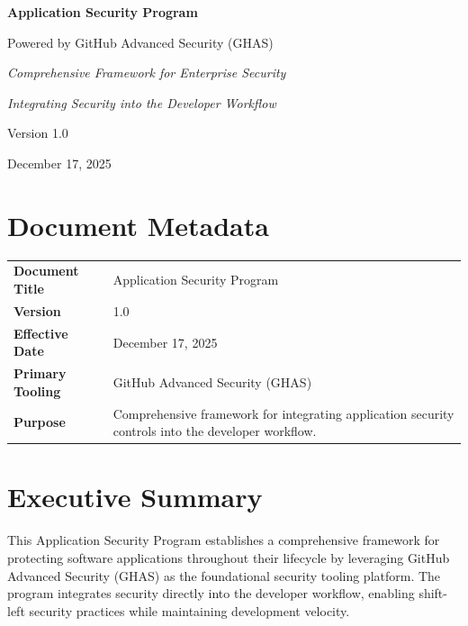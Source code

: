 \documentclass[11pt]{article}
\begin{document}
\begin{titlepage}
\centering
\vspace*{1.5cm}
{\LARGE\bfseries Application Security Program\par}
\vspace{0.4cm}
{\Large Powered by GitHub Advanced Security (GHAS)\par}
\vspace{0.9cm}
{\large\itshape Comprehensive Framework for Enterprise Security\par}
\vspace{0.25em}
{\large\itshape Integrating Security into the Developer Workflow\par}
\vspace{0.25em}
\vfill
{\large Version 1.0\par}
{\large December 17, 2025\par}
\end{titlepage}

\tableofcontents
\clearpage

\section*{Document Metadata}

\begin{tabular}{@{}p{}p{}@{}}
\toprule
\textbf{Document Title} & Application Security Program \\
\textbf{Version} & 1.0 \\
\textbf{Effective Date} & December 17, 2025 \\
\textbf{Primary Tooling} & GitHub Advanced Security (GHAS) \\
\textbf{Purpose} & Comprehensive framework for integrating application security controls into the developer workflow. \\
\bottomrule
\end{tabular}

\clearpage
{}
\section{Executive Summary}

This Application Security Program establishes a comprehensive framework for protecting software applications throughout their lifecycle by leveraging GitHub Advanced Security (GHAS) as the foundational security tooling platform. The program integrates security directly into the developer workflow, enabling shift-left security practices while maintaining development velocity.
\end{document}
